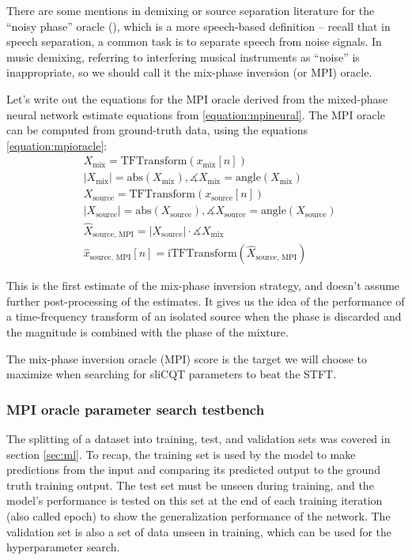 \documentclass[report.tex]{subfiles}
\begin{document}
There are some mentions in demixing or source separation literature for the ``noisy phase'' oracle (\cite{noisyphase1, noisyphase2}), which is a more speech-based definition -- recall that in speech separation, a common task is to separate speech from noise signals. In music demixing, referring to interfering musical instruments as ``noise'' is inappropriate, so we should call it the mix-phase inversion (or MPI) oracle.

Let's write out the equations for the MPI oracle derived from the mixed-phase neural network estimate equations from \ref{equation:mpineural}. The MPI oracle can be computed from ground-truth data, using the equations \ref{equation:mpioracle}:
\begin{align}\tag{4}\label{equation:mpioracle}
	\nonumber & X_{\text{mix}} = \text{TFTransform}(x_{\text{mix}}[n])\\
	\nonumber & |X_{\text{mix}}| = \text{abs}(X_{\text{mix}}), \measuredangle{X_{\text{mix}}} = \text{angle}(X_{\text{mix}})\\
	\nonumber & X_{\text{source}} = \text{TFTransform}(x_{\text{source}}[n])\\
	\nonumber & |X_{\text{source}}| = \text{abs}(X_{\text{source}}), \measuredangle{X_{\text{source}}} = \text{angle}(X_{\text{source}})\\
	\nonumber & \hat{X}_{\text{source, MPI}} = |X_{\text{source}}| \cdot \measuredangle{X_{\text{mix}}}\\
	\nonumber & \hat{x}_{\text{source, MPI}}[n] = \text{iTFTransform}(\hat{X}_{\text{source, MPI}})
\end{align}

This is the first estimate of the mix-phase inversion strategy, and doesn't assume further post-processing of the estimates. It gives us the idea of the performance of a time-frequency transform of an isolated source when the phase is discarded and the magnitude is combined with the phase of the mixture.

The mix-phase inversion oracle (MPI) score is the target we will choose to maximize when searching for sliCQT parameters to beat the STFT.

\subsubsection{MPI oracle parameter search testbench}
\label{sec:mpiparam}

The splitting of a dataset into training, test, and validation sets was covered in section \ref{sec:ml}. To recap, the training set is used by the model to make predictions from the input and comparing its predicted output to the ground truth training output. The test set must be unseen during training, and the model's performance is tested on this set at the end of each training iteration (also called epoch) to show the generalization performance of the network. The validation set is also a set of data unseen in training, which can be used for the hyperparameter search.
\end{document}
